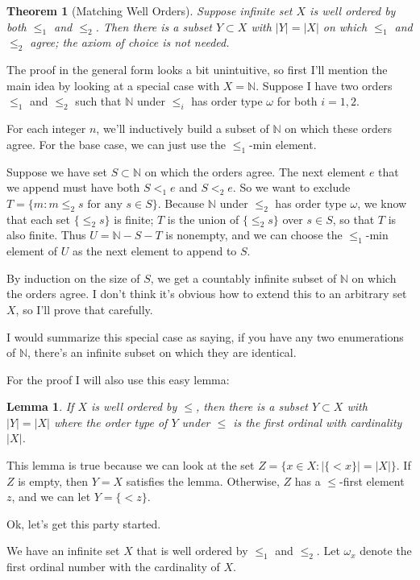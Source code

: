 \documentclass[11pt]{amsart}
\newtheorem{Lemma}[Def]{Lemma}
\newtheorem{Thm}[Def]{Theorem}
\newcommand\bpf[1][]{\smallskip\noindent{\bf Proof#1.}\quad}
\newcommand\N{\mathbb N}
\begin{document}
\begin{Thm}[Matching Well Orders]
Suppose infinite set $X$ is well ordered by both $\le_1$ and $\le_2$.
Then there is a subset $Y \subset X$ with $|Y| = |X|$ on which
$\le_1$ and $\le_2$ agree; the axiom of choice is not needed.
\end{Thm}

The proof in the general form looks a bit unintuitive, so first I'll mention the
main idea by looking at a special case with $X=\N$.
Suppose I have two orders $\le_1$ and $\le_2$ such that
$\N$ under $\le_i$ has order type $\omega$ for both $i=1,2$.

For each integer $n$, we'll inductively build a subset of $\N$ on which
these orders agree. For the base case, we can just use the $\le_1$-min
element.

Suppose we have set $S\subset\N$ on which the orders agree.
The next element $e$ that we append must have both $S <_1 e$ and $S <_2 e$.
So we want to exclude $T = \{ m : m \le_2 s \text{ for any } s \in S\}$.
Because $\N$ under $\le_2$ has order type $\omega$, we know that each
set $\{ \le_2 s \}$ is finite; $T$ is the union of $\{ \le_2 s\}$ over $s\in S$, so that
$T$ is also finite. Thus $U = \N - S - T$ is nonempty, and we can choose the
$\le_1$-min element of $U$ as the next element to append to $S$.

By induction on the size of $S$, we get a countably infinite subset of $\N$ on which the orders agree.
I don't think it's obvious how to extend this to an arbitrary set $X$, so I'll prove that carefully.

I would summarize this special case as saying, if you have any two enumerations of $\N$, there's
an infinite subset on which they are identical.

For the proof I will also use this easy lemma:

\begin{Lemma}\label{first_ordinal_lemma}
If $X$ is well ordered by $\le$, then there is a subset $Y\subset X$ with
$|Y| = |X|$ where the order type of $Y$ under $\le$ is the first ordinal
with cardinality $|X|$.
\end{Lemma}

This lemma is true because we can look at the set $Z = \{ x\in X : |\{ < x \}| = |X| \}$.
If $Z$ is empty, then $Y=X$ satisfies the lemma. Otherwise, $Z$ has a $\le$-first element $z$,
and we can let $Y = \{ < z \}$.

\bpf
Ok, let's get this party started.

We have an infinite set $X$ that is well ordered by $\le_1$ and $\le_2$.
Let $\omega_x$ denote the first ordinal number with the cardinality of $X$.
\end{document}
